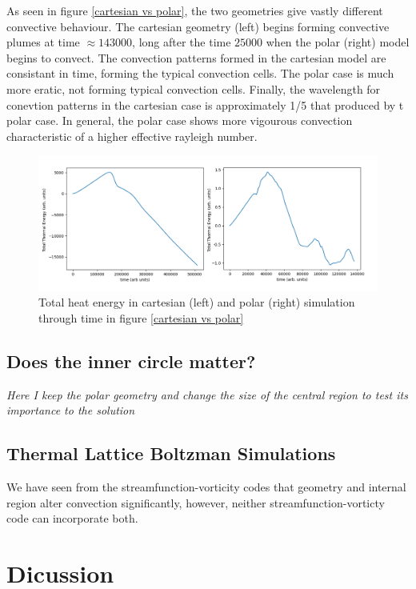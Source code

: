 \documentclass{article}
\begin{document}
As seen in figure \ref{cartesian vs polar}, the two geometries give vastly different convective behaviour. The cartesian geometry (left) begins forming convective plumes at time $\approx 143000$, long after the time $25000$ when the polar (right) model begins to convect. The convection patterns formed in the cartesian model are consistant in time, forming the typical convection cells. The polar case is much more eratic, not forming typical convection cells. Finally, the wavelength for conevtion patterns in the cartesian case is approximately 1/5 that produced by t polar case. In general, the polar case shows more vigourous convection characteristic of a higher effective rayleigh number. 


\begin{figure}
	\centering
	\includegraphics{totalQ.png}
	\caption{Total heat energy in cartesian (left) and polar (right) simulation through time in figure \ref{cartesian vs polar}}
	\label{cartesian vs polar energy}
\end{figure}


\subsection*{Does the inner circle matter?}
{\it{Here I keep the polar geometry and change the size of the central region to test its importance to the solution}}



\subsection*{Thermal Lattice Boltzman Simulations}
We have seen from the streamfunction-vorticity codes that geometry and internal region alter convection significantly, however, neither streamfunction-vorticty code can incorporate both. 



\section*{Dicussion}
\end{document}
